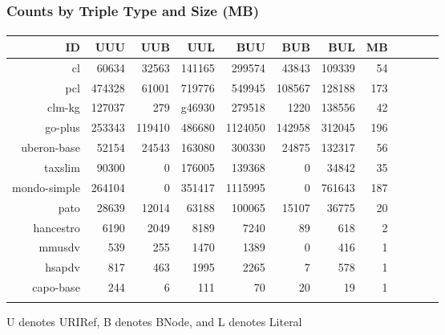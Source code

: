 \documentclass[aspectratio=169,xcolor=dvipsnames]{beamer}
\begin{document}
\begin{frame}
  \frametitle{Counts by Triple Type and Size (MB)}
  \framesubtitle{}
  \begin{table}\footnotesize
    \begin{center}
      \begin{tabular}{rrrrrrrrrrrr}
        \hline
        ID & UUU & UUB & UUL & BUU & BUB & BUL & MB \\
        \hline
        \hline
        cl & 60634 & 32563 & 141165 & 299574 & 43843 & 109339 & 54 \\
        pcl & 474328 & 61001 & 719776 & 549945 & 108567 & 128188 & 173 \\
        clm-kg & 127037 & 279 & g46930 & 279518 & 1220 & 138556 & 42 \\
        go-plus & 253343 & 119410 & 486680 & 1124050 & 142958 & 312045 & 196 \\
        uberon-base & 52154 & 24543 &163080 & 300330 & 24875 & 132317 & 56 \\
        taxslim & 90300 & 0 & 176005 & 139368 & 0 & 34842 & 35 \\
        mondo-simple & 264104 & 0 & 351417 & 1115995 & 0 & 761643 & 187 \\
        pato & 28639 & 12014 & 63188 & 100065 & 15107 & 36775 & 20 \\
        hancestro & 6190 & 2049 & 8189 & 7240 & 89 & 618 & 2 \\
        mmusdv & 539 & 255 & 1470 & 1389 & 0 & 416 & 1 \\
        hsapdv & 817 & 463 & 1995 & 2265 & 7 & 578 & 1 \\
        capo-base & 244 & 6 & 111 & 70 & 20 & 19 & 1 \\
        \hline \\
      \end{tabular}
    \end{center}
    U denotes URIRef, B denotes BNode, and L denotes Literal
  \end{table}
\end{frame}



\end{document}
